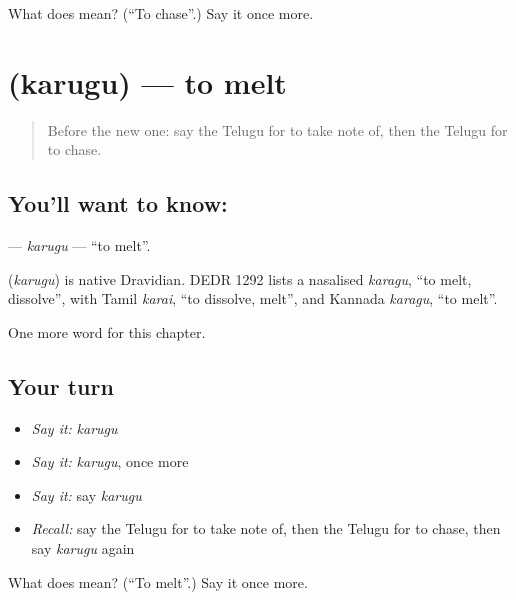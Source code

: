 \begin{tcolorbox}[breakable,colback=teal!4,colframe=teal!35!black,title={Before you move on}]
What does  mean? (\textquotedblleft{}To chase\textquotedblright{}.) Say it once more.
\end{tcolorbox}
\section[\texorpdfstring{\te{కరుగు} (karugu)}{కరుగు (karugu)}]{ (karugu) — to melt}

\label{lesson:TE-C285-karugu}



\begin{quote}
Before the new one: say the Telugu for to take note of, then the Telugu for to chase.
\end{quote}

\subsection*{You'll want to know: }
\textbf{} — \emph{karugu} — \textquotedblleft{}to melt\textquotedblright{}.

\begin{cousinweb}
\textbf{} (\emph{karugu}) is native Dravidian. DEDR 1292 lists a nasalised \emph{karagu}, \textquotedblleft{}to melt, dissolve\textquotedblright{}, with Tamil \emph{karai}, \textquotedblleft{}to dissolve, melt\textquotedblright{}, and Kannada \emph{karagu}, \textquotedblleft{}to melt\textquotedblright{}.
\end{cousinweb}

\begin{grammarlens}[title={What you've built}]
One more word for this chapter.
\end{grammarlens}

\subsection*{Your turn}
\begin{itemize}
\raggedright
  \item \emph{Say it:} \emph{karugu}
  \item \emph{Say it:} \emph{karugu}, once more
  \item \emph{Say it:} say \emph{karugu}
  \item \emph{Recall:} say the Telugu for to take note of, then the Telugu for to chase, then say \emph{karugu} again
\end{itemize}

\begin{tcolorbox}[breakable,colback=teal!4,colframe=teal!35!black,title={Before you move on}]
What does  mean? (\textquotedblleft{}To melt\textquotedblright{}.) Say it once more.
\end{tcolorbox}
